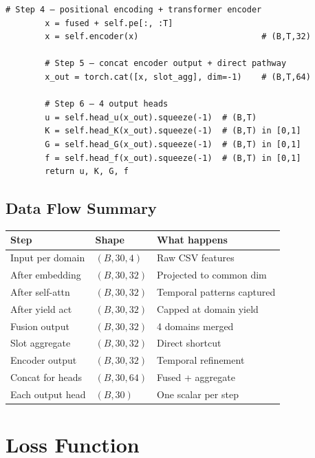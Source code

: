\documentclass[12pt,a4paper]{article}
\begin{document}
\begin{lstlisting}[caption={SpecializedSlotTransformer — complete forward pass.}]
        # Step 4 — positional encoding + transformer encoder
        x = fused + self.pe[:, :T]
        x = self.encoder(x)                         # (B,T,32)

        # Step 5 — concat encoder output + direct pathway
        x_out = torch.cat([x, slot_agg], dim=-1)    # (B,T,64)

        # Step 6 — 4 output heads
        u = self.head_u(x_out).squeeze(-1)  # (B,T)
        K = self.head_K(x_out).squeeze(-1)  # (B,T) in [0,1]
        G = self.head_G(x_out).squeeze(-1)  # (B,T) in [0,1]
        f = self.head_f(x_out).squeeze(-1)  # (B,T) in [0,1]
        return u, K, G, f
\end{lstlisting}

\subsection*{Data Flow Summary}

\begin{center}
\begin{tabular}{lll}
\toprule
\textbf{Step} & \textbf{Shape} & \textbf{What happens} \\
\midrule
Input per domain   & $(B, 30, 4)$   & Raw CSV features \\
After embedding    & $(B, 30, 32)$  & Projected to common dim \\
After self-attn    & $(B, 30, 32)$  & Temporal patterns captured \\
After yield act    & $(B, 30, 32)$  & Capped at domain yield \\
Fusion output      & $(B, 30, 32)$  & 4 domains merged \\
Slot aggregate     & $(B, 30, 32)$  & Direct shortcut \\
Encoder output     & $(B, 30, 32)$  & Temporal refinement \\
Concat for heads   & $(B, 30, 64)$  & Fused + aggregate \\
Each output head   & $(B, 30)$      & One scalar per step \\
\bottomrule
\end{tabular}
\end{center}

\section{Loss Function}
\end{document}
